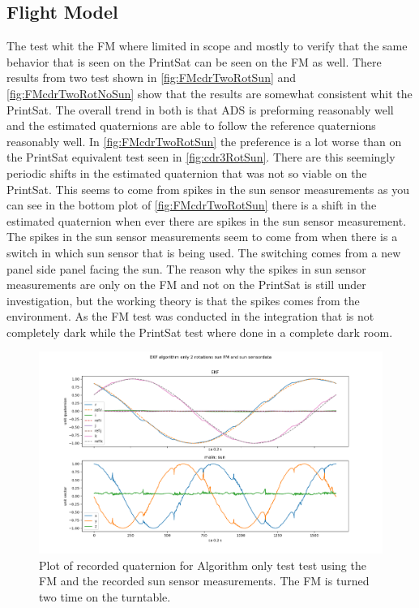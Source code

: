 \subsection{Flight Model}
The test whit the FM where limited in scope and mostly to verify that the same behavior that is seen on the PrintSat can be seen on the FM as well. There results from two test shown in \autoref{fig:FMcdrTwoRotSun} and \autoref{fig:FMcdrTwoRotNoSun} show that the results are somewhat consistent whit the PrintSat. The overall trend in both is that ADS is preforming reasonably well and the estimated quaternions are able to follow the reference quaternions reasonably well. In \autoref{fig:FMcdrTwoRotSun} the preference is a lot worse than on the PrintSat equivalent test seen in \autoref{fig:cdr3RotSun}. There are this seemingly periodic shifts in the estimated quaternion that was not so viable on the PrintSat. This seems to come from spikes in the sun sensor measurements as you can see in the bottom plot of \autoref{fig:FMcdrTwoRotSun} there is a shift in the estimated quaternion when ever there are spikes in the sun sensor measurement. The spikes in the sun sensor measurements seem to come from when there is a switch in which sun sensor that is being used. The switching comes from  a new panel side panel facing the sun. The reason why the spikes in sun sensor measurements are only on the FM and not on the PrintSat is still under investigation, but the working theory is that the spikes comes from the environment. As the FM test was conducted in the integration that is not completely dark while the PrintSat test where done in a complete dark room. 

\begin{figure}[tbp]
	\centering
	\includegraphics[width=1\columnwidth]{./Pictures/test1EKFandSUN}
	\caption{Plot of recorded quaternion for Algorithm only test test using the FM and the recorded sun sensor measurements. The FM is turned two time on the turntable.}
	\label{fig:FMcdrTwoRotSun}
\end{figure}

